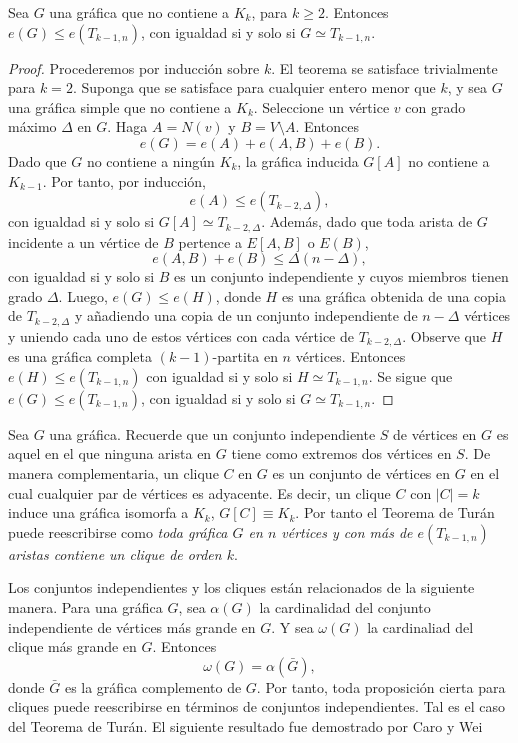 \begin{theorem}[Turán] \label{turan}
  Sea $G$ una gráfica que no contiene a $K_k$, para $k \geq
  2$. Entonces $e(G) \leq e(T_{{k-1}, n})$, con igualdad si y solo si
  $G \simeq T_{{k-1}, n}$.
\end{theorem}

\begin{proof}
  Procederemos por inducción sobre $k$. El teorema se satisface
  trivialmente para $k=2$.  Suponga que se satisface para cualquier
  entero menor que $k$, y sea $G$ una gráfica simple que no contiene
  a $K_k$. Seleccione un vértice $v$ con grado máximo $\Delta$ en
  $G$. Haga $A = N(v)$ y $B = V \setminus A$. Entonces
  $$e(G) = e(A) + e(A, B) + e(B).$$
  Dado que $G$ no contiene a ningún $K_k$, la gráfica inducida $G[A]$
  no contiene a $K_{k-1}$. Por tanto, por inducción,
  $$e(A) \leq e(T_{k-2, \Delta}),$$
  con igualdad si y solo si $G[A] \simeq T_{{k-2}, \Delta}$. Además,
  dado que toda arista de $G$ incidente a un vértice de $B$ pertence
  a $E[A, B]$ o $E( B )$,
  $$e(A, B) + e(B) \leq \Delta (n - \Delta),$$
  con igualdad si y solo si $B$ es un conjunto independiente y cuyos
  miembros tienen grado $\Delta$. Luego, $e(G) \leq e(H)$, donde $H$
  es una gráfica obtenida de una copia de $T_{{k-2}, \Delta}$ y
  añadiendo una copia de un conjunto independiente de $n-\Delta$
  vértices y uniendo cada uno de estos vértices con cada vértice de
  $T_{{k-2}, \Delta}$. Observe que $H$ es una gráfica completa
  $(k-1)$-partita en $n$ vértices. Entonces $e(H) \leq e(T_{{k-1},
  n})$ con igualdad si y solo si $H \simeq T_{{k-1}, n}$. Se sigue
  que $e(G) \leq e(T_{k-1, n})$, con igualdad si y solo si $G \simeq
  T_{k-1, n}$.
\end{proof}

Sea $G$ una gráfica. Recuerde que un conjunto independiente $S$ de
vértices en $G$ es aquel en el que ninguna arista en $G$ tiene como
extremos dos vértices en $S$. De manera complementaria, un clique $C$
en $G$ es un conjunto de vértices en $G$ en el cual cualquier par de
vértices es adyacente. Es decir, un clique $C$ con $\vert C \vert =
k$ induce una gráfica isomorfa a $K_k$, $G[C] \equiv K_k$. Por tanto
el Teorema de Turán puede reescribirse como \textit{toda gráfica $G$
  en $n$ vértices y con más de $e(T_{k-1, n})$ aristas contiene un
clique de orden $k$}.

Los conjuntos independientes y los cliques están relacionados de la siguiente
manera. Para una gráfica $G$, sea $\alpha(G)$ la cardinalidad del conjunto
independiente de vértices más grande en $G$. Y sea $\omega(G)$ la
cardinaliad del
clique más grande en $G$. Entonces
$$\omega(G) = \alpha(\bar{G}),$$
donde $\bar{G}$ es la gráfica complemento de $G$. Por tanto, toda
proposición cierta para cliques puede reescribirse en términos de
conjuntos independientes. Tal es el caso del Teorema de Turán. El
siguiente resultado fue demostrado por
Caro \cite{caro1979} y Wei  %

